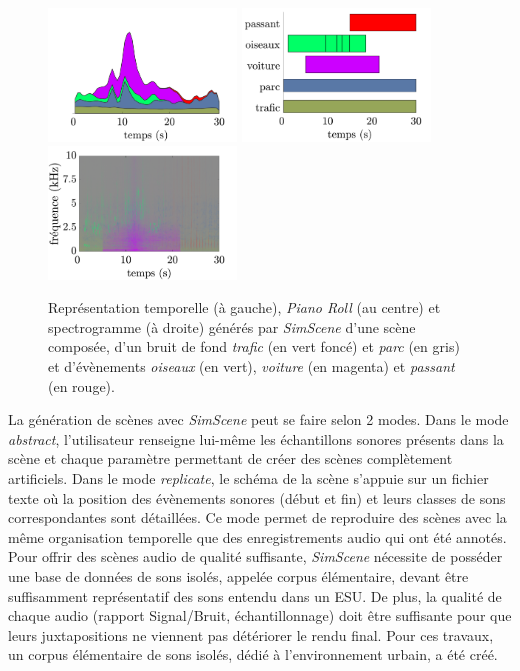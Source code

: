 \begin{figure}[ht]
\includegraphics[width=5cm]{./figures/SimScene/exemple-timeDomain.pdf}\hfill
\includegraphics[width=5cm]{./figures/SimScene/exemple-pianoRoll.pdf}\hfill
\includegraphics[width=5cm]{./figures/SimScene/exemple-spectrum.pdf}
\caption{Représentation temporelle (à gauche), \textit{Piano Roll} (au centre) et spectrogramme (à droite) générés par \textit{SimScene} d'une scène composée, d'un bruit de fond \textit{trafic} (en vert foncé) et \textit{parc} (en gris) et d'évènements \textit{oiseaux} (en vert), \textit{voiture} (en magenta) et \textit{passant} (en rouge).}\label{fig:somefiglabel}
\end{figure}

La génération de scènes avec \textit{SimScene} peut se faire selon 2 modes. Dans le mode \textit{abstract}, l'utilisateur renseigne lui-même les échantillons sonores présents dans la scène et chaque paramètre permettant de créer des scènes complètement artificiels. Dans le mode \textit{replicate}, le schéma de la scène s'appuie sur un fichier texte où la position des évènements sonores (début et fin) et leurs classes de sons correspondantes sont détaillées. Ce mode permet de reproduire des scènes avec la même organisation temporelle que des enregistrements audio qui ont été annotés.\\

Pour offrir des scènes audio de qualité suffisante, \textit{SimScene} nécessite de posséder une base de données de sons isolés, appelée corpus élémentaire, devant être suffisamment représentatif des sons entendu dans un ESU. De plus, la qualité de chaque audio (rapport Signal/Bruit, échantillonnage) doit être suffisante pour que leurs juxtapositions ne viennent pas détériorer le rendu final. Pour ces travaux, un corpus élémentaire de sons isolés, dédié à l'environnement urbain, a été créé.


